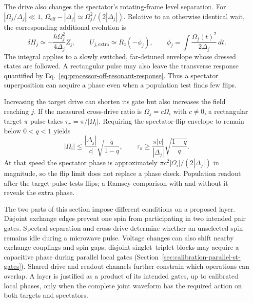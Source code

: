 The drive also changes the spectator's rotating-frame
level separation. For \(|\Omega_j/\Delta_j|\ll1\),
\(\Omega_{\mathrm{eff}}-|\Delta_j|
 \simeq\Omega_j^2/(2|\Delta_j|)\).
Relative to an otherwise identical wait, the corresponding
additional evolution is
\begin{equation}
 \delta H_j\simeq-\frac{\hbar\Omega_j^2}{4\Delta_j}Z_j,
 \qquad
 U_{j,\mathrm{extra}}\simeq R_z(-\phi_j),\qquad
 \phi_j=\int\frac{\Omega_j(t)^2}{2\Delta_j}\,dt.
 \label{eq:processor-spectator-phase}
\end{equation}
The integral applies to a slowly switched, far-detuned
envelope whose dressed states are followed. A rectangular
pulse may also leave the transverse response quantified by
Eq.~\eqref{eq:processor-off-resonant-response}. Thus a
spectator superposition can acquire a phase even when a
population test finds few flips.

Increasing the target drive can shorten its gate but also
increases the field reaching \(j\). If the measured
cross-drive ratio is \(\Omega_j=c\Omega_i\) with
\(c\ne0\), a rectangular target \(\pi\) pulse takes
\(\tau_\pi=\pi/|\Omega_i|\). Requiring the spectator-flip
envelope to remain below \(0<q<1\) yields
\begin{equation}
 |\Omega_i|\leq
 \frac{|\Delta_j|}{|c|}\sqrt{\frac{q}{1-q}},
 \qquad
 \tau_\pi\geq
 \frac{\pi|c|}{|\Delta_j|}\sqrt{\frac{1-q}{q}}.
 \label{eq:processor-addressing-speed}
\end{equation}
At that speed the spectator phase is approximately
\(\pi c^2|\Omega_i|/(2|\Delta_j|)\) in magnitude,
so the flip limit does not replace a phase check.
Population readout after the target pulse tests flips;
a Ramsey comparison with and without it reveals the
extra phase.

The two parts of this section impose different conditions
on a proposed layer. Disjoint exchange edges prevent one
spin from participating in two intended pair gates.
Spectral separation and cross-drive determine whether an
unselected spin remains idle during a microwave pulse.
Voltage changes can also shift nearby exchange couplings
and spin gaps; disjoint singlet--triplet blocks may acquire
a capacitive phase during parallel local gates
(Section~\ref{sec:calibration-parallel-st-gates}).
Shared drive and readout channels further constrain which
operations can overlap. A layer is justified as a product
of its intended gates, up to calibrated local phases, only
when the complete joint waveform has the required action
on both targets and spectators.

